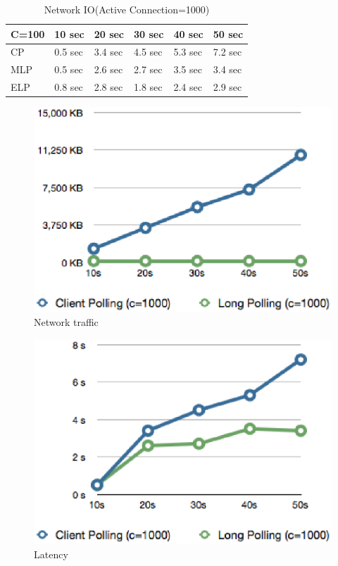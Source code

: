 \begin{table}
\centering \caption{\label{tb:traffic} Network IO(Active Connection=1000)}
\begin{tabular}{|l|l|l|l|l|l|}
    \hline C=100 & 10 sec & 20 sec & 30 sec & 40 sec & 50 sec \\
    \hline CP & 0.5 sec & 3.4 sec & 4.5 sec & 5.3 sec & 7.2 sec \\
    \hline MLP & 0.5 sec & 2.6 sec & 2.7 sec & 3.5 sec & 3.4 sec \\
    \hline ELP & 0.8 sec & 2.8 sec & 1.8 sec & 2.4 sec & 2.9 sec \\
    \hline
\end{tabular}
\end{table}

\begin{figure}[htb!]
\centering%
    \includegraphics[scale=0.60]{figures/io.eps}
    \caption{Network traffic}
    \label{fig:traffic_io}
\end{figure}

\begin{figure}[htb!]
\centering%
    \includegraphics[scale=0.60]{figures/latency.eps}
    \caption{Latency}
    \label{fig:traffic_latency}
\end{figure}

